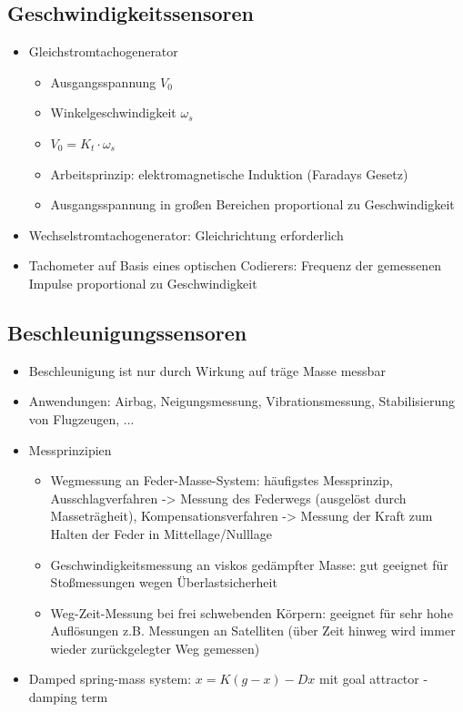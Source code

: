 \documentclass[paper=a4, fontsize=11pt]{scrartcl} %
\numberwithin{equation}{section} %
\numberwithin{figure}{section} %
\numberwithin{table}{section} %
\begin{document}
\subsection{Geschwindigkeitssensoren}

\begin{itemize}
\item Gleichstromtachogenerator
\begin{itemize}
\item Ausgangsspannung $V_0$
\item Winkelgeschwindigkeit $\omega_s$
\item $V_0 = K_t \cdot \omega_s$
\item Arbeitsprinzip: elektromagnetische Induktion (Faradays Gesetz)
\item Ausgangsspannung in großen Bereichen proportional zu Geschwindigkeit
\end{itemize}
\item Wechselstromtachogenerator: Gleichrichtung erforderlich
\item Tachometer auf Basis eines optischen Codierers: Frequenz der gemessenen Impulse proportional zu Geschwindigkeit
\end{itemize}

\subsection{Beschleunigungssensoren}

\begin{itemize}
\item Beschleunigung ist nur durch Wirkung auf träge Masse messbar
\item Anwendungen: Airbag, Neigungsmessung, Vibrationsmessung, Stabilisierung von Flugzeugen, ...
\item Messprinzipien
\begin{itemize}
\item Wegmessung an Feder-Masse-System: häufigstes Messprinzip, Ausschlagverfahren -> Messung des Federwegs (ausgelöst durch Masseträgheit), Kompensationsverfahren -> Messung der Kraft zum Halten der Feder in Mittellage/Nulllage
\item Geschwindigkeitsmessung an viskos gedämpfter Masse: gut geeignet für Stoßmessungen wegen Überlastsicherheit
\item Weg-Zeit-Messung bei frei schwebenden Körpern: geeignet für sehr hohe Auflösungen z.B. Messungen an Satelliten (über Zeit hinweg wird immer wieder zurückgelegter Weg gemessen)
\end{itemize}
\item Damped spring-mass system: $x = K(g-x)-Dx$ mit goal attractor - damping term
\end{itemize}
\end{document}
